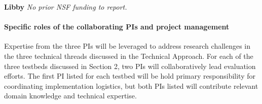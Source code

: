 \documentclass[11pt]{article}
\begin{document}
\noindent\textbf{Libby} \emph{No prior NSF funding to report.}



\pagebreak
\setcounter{page}{1}








\paragraph{Specific roles of the collaborating PIs and project management}


Expertise from the three PIs will be leveraged to address research challenges in the three technical threads discussed in the Technical Approach.
For each of the three testbeds discussed in Section 2, two PIs will collaboratively lead evaluation efforts. 
The first PI listed for each testbed will be hold primary responsibility for coordinating implementation logistics, but both PIs listed will contribute relevant domain knowledge and technical expertise. 
\end{document}
